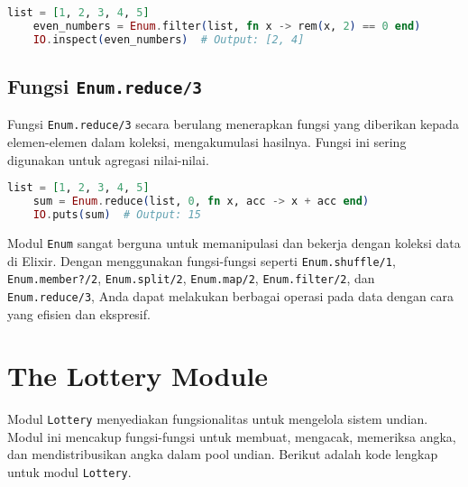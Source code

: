 \begin{lstlisting}[language=Elixir]
	list = [1, 2, 3, 4, 5]
	even_numbers = Enum.filter(list, fn x -> rem(x, 2) == 0 end)
	IO.inspect(even_numbers)  # Output: [2, 4]
\end{lstlisting}

\subsection{Fungsi \texttt{Enum.reduce/3}}

Fungsi \texttt{Enum.reduce/3} secara berulang menerapkan fungsi yang diberikan kepada elemen-elemen dalam koleksi, mengakumulasi hasilnya. Fungsi ini sering digunakan untuk agregasi nilai-nilai.

\begin{lstlisting}[language=Elixir]
	list = [1, 2, 3, 4, 5]
	sum = Enum.reduce(list, 0, fn x, acc -> x + acc end)
	IO.puts(sum)  # Output: 15
\end{lstlisting}

Modul \texttt{Enum} sangat berguna untuk memanipulasi dan bekerja dengan koleksi data di Elixir. Dengan menggunakan fungsi-fungsi seperti \texttt{Enum.shuffle/1}, \texttt{Enum.member?/2}, \texttt{Enum.split/2}, \texttt{Enum.map/2}, \texttt{Enum.filter/2}, dan \texttt{Enum.reduce/3}, Anda dapat melakukan berbagai operasi pada data dengan cara yang efisien dan ekspresif.

\section{The Lottery Module}

Modul \texttt{Lottery} menyediakan fungsionalitas untuk mengelola sistem undian. Modul ini mencakup fungsi-fungsi untuk membuat, mengacak, memeriksa angka, dan mendistribusikan angka dalam pool undian. Berikut adalah kode lengkap untuk modul \texttt{Lottery}.

